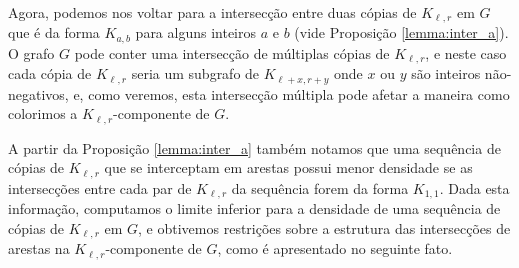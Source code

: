 \documentclass[12pt,a4paper]{book}
\newcommand{\K}{K_{\ell,r}} %
\begin{document}
     Agora, podemos nos voltar para a intersecção entre duas cópias de $\K$ em $G$ que é da forma $K_{a,b}$ para alguns inteiros $a$ e $b$ (vide Proposição \ref{lemma:inter_a}). 
	 O grafo $G$ pode conter uma intersecção de múltiplas cópias de
    $\K$, e neste caso cada cópia de $\K$ seria um subgrafo de $K_{\ell+x,r+y}$ onde $x$ ou $y$ são inteiros não-negativos, e, como veremos, esta intersecção múltipla pode afetar a maneira como colorimos a $\K$-componente de $G$. %
    
    A partir da Proposição \ref{lemma:inter_a} também notamos que uma sequência de cópias de $\K$ que se interceptam em arestas possui menor densidade se as intersecções entre cada par de $\K$ da sequência forem da forma $K_{1,1}$. 
     Dada esta informação, computamos o limite inferior para a densidade de uma sequência de cópias de $\K$ em $G$, e obtivemos restrições sobre a estrutura das intersecções de arestas na $\K$-componente de $G$, como é apresentado no seguinte fato.
     
\end{document}
